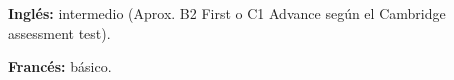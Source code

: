\begin{cvpubs}
  \cvpub
    {
      \begin{cvlist}
        \item{\textbf{Inglés:} intermedio (Aprox. B2 First o C1 Advance según el Cambridge assessment test). }
        \item{\textbf{Francés:} básico. }
      \end{cvlist}
    }\vspace{-4pt}
\end{cvpubs}